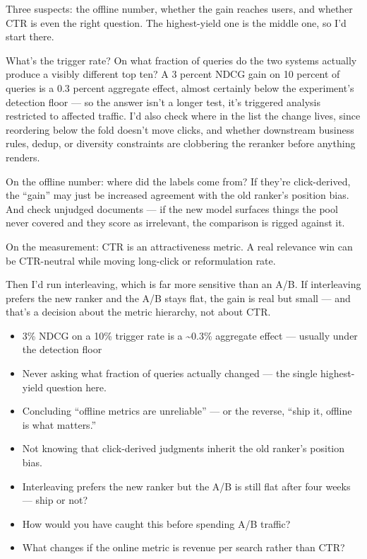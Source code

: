 \documentclass[10pt,twoside]{book}
\newcommand{\lab}[1]{\par\vspace{5pt}\noindent{\sffamily\footnotesize\bfseries\color{accent}#1}\par\vspace{1pt}}
\newcommand{\flab}[1]{\par\vspace{5pt}\noindent{\sffamily\footnotesize\bfseries\color{flag}#1}\par\vspace{1pt}}
\begin{document}
\lab{Say this}
Three suspects: the offline number, whether the gain reaches users, and whether CTR is even the right question. The highest-yield one is the middle one, so I'd start there.\par\vspace{3pt}
What's the trigger rate? On what fraction of queries do the two systems actually produce a visibly different top ten? A 3 percent NDCG gain on 10 percent of queries is a 0.3 percent aggregate effect, almost certainly below the experiment's detection floor --- so the answer isn't a longer test, it's triggered analysis restricted to affected traffic. I'd also check where in the list the change lives, since reordering below the fold doesn't move clicks, and whether downstream business rules, dedup, or diversity constraints are clobbering the reranker before anything renders.\par\vspace{3pt}
On the offline number: where did the labels come from? If they're click-derived, the ``gain'' may just be increased agreement with the old ranker's position bias. And check unjudged documents --- if the new model surfaces things the pool never covered and they score as irrelevant, the comparison is rigged against it.\par\vspace{3pt}
On the measurement: CTR is an attractiveness metric. A real relevance win can be CTR-neutral while moving long-click or reformulation rate.\par\vspace{3pt}
Then I'd run interleaving, which is far more sensitive than an A/B. If interleaving prefers the new ranker and the A/B stays flat, the gain is real but small --- and that's a decision about the metric hierarchy, not about CTR.\par\vspace{3pt}
\lab{Numbers}
\begin{itemize}
\item 3\% NDCG on a 10\% trigger rate is a \textasciitilde{}0.3\% aggregate effect --- usually under the detection floor
\end{itemize}
\flab{Loses the signal}
\begin{itemize}
\item Never asking what fraction of queries actually changed --- the single highest-yield question here.
\item Concluding ``offline metrics are unreliable'' --- or the reverse, ``ship it, offline is what matters.''
\item Not knowing that click-derived judgments inherit the old ranker's position bias.
\end{itemize}
\lab{Then they ask}
\begin{itemize}
\item Interleaving prefers the new ranker but the A/B is still flat after four weeks --- ship or not?
\item How would you have caught this before spending A/B traffic?
\item What changes if the online metric is revenue per search rather than CTR?
\end{itemize}
\vspace{2pt}\noindent{\color{muted}\rule{\linewidth}{0.3pt}}
\end{document}
